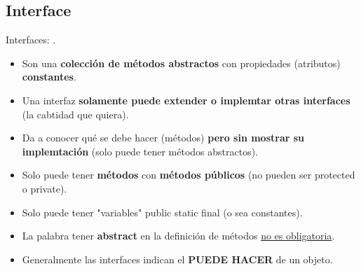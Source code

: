 \documentclass[../main.tex]{subfiles}
\begin{document}
    \subsection{Interface}
        Interfaces: \cite{interfaces}.
        \begin{itemize}
            \item Son una \textbf{colección de métodos abstractos} con propiedades (atributos) \textbf{constantes}.
            \item Una interfaz \textbf{solamente puede extender o implemtar otras interfaces} (la cabtidad que quiera).
            \item Da a conocer qué se debe hacer (métodos) \textbf{pero sin mostrar su implemtación} (solo puede tener métodos abstractos).
            \item Solo puede tener \textbf{métodos} con \textbf{métodos públicos} (no pueden ser protected o private).
            \item Solo puede tener "variables" public static final (o sea constantes).
            \item La palabra tener \textbf{abstract} en la definición de métodos \underline{no es obligatoria}.
            \item Generalmente las interfaces indican el \textbf{PUEDE HACER} de un objeto.
        \end{itemize}
\end{document}
